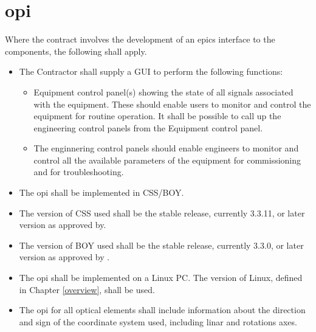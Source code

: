 \documentclass[11pt
  , a4paper
  , article
  , oneside
]{memoir}
\begin{document}
\section{\Gls{opi}}
Where the contract involves the development of an \Gls{epics} interface to the components, the following shall apply.
\begin{itemize}
\item The Contractor shall supply a GUI to perform the following functions:
  \begin{itemize}
  \item Equipment control panel(s) showing the state of all signals associated with the equipment. These should enable users to monitor and control the equipment for routine operation. It shall be possible to call up the engineering control panels from the Equipment control panel.
  \item The enginnering control panels should enable engineers to monitor and control all the available parameters of the equipment for commissioning and for troubleshooting.
  \end{itemize}
\item The \Gls{opi} shall be implemented in CSS/BOY.
\item The version of CSS used shall be the stable release, currently 3.3.11, or later version as approved by.
\item The version of BOY used shall be the stable release, currently 3.3.0, or later version as approved by .
\item The \Gls{opi} shall be implemented on a Linux PC. The version of Linux, defined in Chapter \ref{overview}, shall be used.
\item The \Gls{opi} for all optical elements shall include information about the direction and sign of the coordinate system used, including linar and rotations axes.

\end{itemize}
\end{document}
